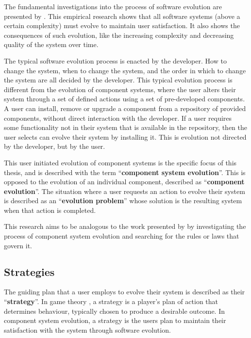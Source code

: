 The fundamental investigations into the process of software evolution are presented by \cite{lehman1980}.
This empirical research shows that all software systems (above a certain complexity) must evolve to maintain user satisfaction.
It also shows the consequences of such evolution, like the increasing complexity and decreasing quality of the system over time.

The typical software evolution process is enacted by the developer.
How to change the system, when to change the system, and the order in which to change the system are all decided by the developer.
This typical evolution process is different from the evolution of component systems, 
where the user alters their system through a set of defined actions using a set of pre-developed components.
A user can install, remove or upgrade a component from a repository of provided components, without direct interaction with the developer.
If a user requires some functionality not in their system that is available in the repository, then the user selects can evolve their system by installing it.
This is evolution not directed by the developer, but by the user. 

This user initiated evolution of component systems is the specific focus of this thesis, and is described with the term ``\textbf{component system evolution}''.
This is opposed to the evolution of an individual component, described as ``\textbf{component evolution}''.
The situation where a user requests an action to evolve their system is described as an ``\textbf{evolution problem}'' whose solution is the resulting system when that action is completed.

This research aims to be analogous to the work presented by \cite{lehman1980} by investigating the process of component system evolution
and searching for the rules or laws that govern it.

\subsection{Strategies}
The guiding plan that a user employs to evolve their system is described as their ``\textbf{strategy}''.
In game theory \citep{watson2008strategy}, a strategy is a player's plan of action that determines behaviour, typically chosen to produce a desirable outcome.
In component system evolution, a strategy is the users plan to maintain their satisfaction with the system through software evolution.


